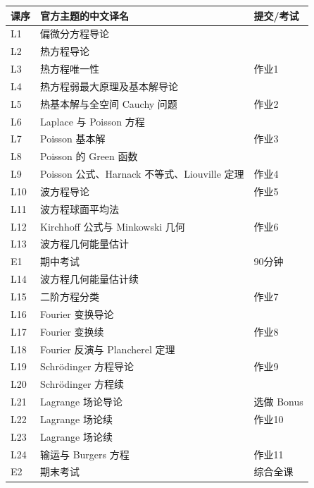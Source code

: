 \begin{longtable}{p{}p{}p{}}
\toprule 课序&官方主题的中文译名&提交/考试\\\midrule\endhead
L1&偏微分方程导论&\\
L2&热方程导论&\\
L3&热方程唯一性&作业1\\
L4&热方程弱最大原理及基本解导论&\\
L5&热基本解与全空间 Cauchy 问题&作业2\\
L6&Laplace 与 Poisson 方程&\\
L7&Poisson 基本解&作业3\\
L8&Poisson 的 Green 函数&\\
L9&Poisson 公式、Harnack 不等式、Liouville 定理&作业4\\
L10&波方程导论&作业5\\
L11&波方程球面平均法&\\
L12&Kirchhoff 公式与 Minkowski 几何&作业6\\
L13&波方程几何能量估计&\\
E1&期中考试&90分钟\\
L14&波方程几何能量估计续&\\
L15&二阶方程分类&作业7\\
L16&Fourier 变换导论&\\
L17&Fourier 变换续&作业8\\
L18&Fourier 反演与 Plancherel 定理&\\
L19&Schrödinger 方程导论&作业9\\
L20&Schrödinger 方程续&\\
L21&Lagrange 场论导论&选做 Bonus\\
L22&Lagrange 场论续&作业10\\
L23&Lagrange 场论续&\\
L24&输运与 Burgers 方程&作业11\\
E2&期末考试&综合全课\\\bottomrule
\end{longtable}
